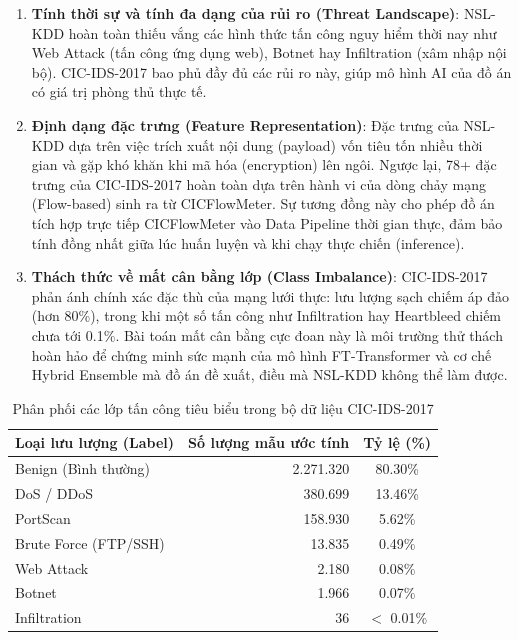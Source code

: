 \documentclass[../DoAn.tex]{subfiles}
\begin{document}
\begin{enumerate}
    \item \textbf{Tính thời sự và tính đa dạng của rủi ro (Threat Landscape)}: NSL-KDD hoàn toàn thiếu vắng các hình thức tấn công nguy hiểm thời nay như Web Attack (tấn công ứng dụng web), Botnet hay Infiltration (xâm nhập nội bộ). CIC-IDS-2017 bao phủ đầy đủ các rủi ro này, giúp mô hình AI của đồ án có giá trị phòng thủ thực tế.
    \item \textbf{Định dạng đặc trưng (Feature Representation)}: Đặc trưng của NSL-KDD dựa trên việc trích xuất nội dung (payload) vốn tiêu tốn nhiều thời gian và gặp khó khăn khi mã hóa (encryption) lên ngôi. Ngược lại, 78+ đặc trưng của CIC-IDS-2017 hoàn toàn dựa trên hành vi của dòng chảy mạng (Flow-based) sinh ra từ CICFlowMeter. Sự tương đồng này cho phép đồ án tích hợp trực tiếp CICFlowMeter vào Data Pipeline thời gian thực, đảm bảo tính đồng nhất giữa lúc huấn luyện và khi chạy thực chiến (inference).
    \item \textbf{Thách thức về mất cân bằng lớp (Class Imbalance)}: CIC-IDS-2017 phản ánh chính xác đặc thù của mạng lưới thực: lưu lượng sạch chiếm áp đảo (hơn 80\%), trong khi một số tấn công như Infiltration hay Heartbleed chiếm chưa tới 0.1\%. Bài toán mất cân bằng cực đoan này là môi trường thử thách hoàn hảo để chứng minh sức mạnh của mô hình FT-Transformer và cơ chế Hybrid Ensemble mà đồ án đề xuất, điều mà NSL-KDD không thể làm được.
\end{enumerate}

\begin{table}[htbp]
\centering
\caption{Phân phối các lớp tấn công tiêu biểu trong bộ dữ liệu CIC-IDS-2017}
\label{tab:cic_distribution}
\begin{tabular}{|l|r|c|}
\hline
\textbf{Loại lưu lượng (Label)} & \textbf{Số lượng mẫu ước tính} & \textbf{Tỷ lệ (\%)} \\
\hline
Benign (Bình thường) & 2.271.320 & 80.30\% \\
\hline
DoS / DDoS & 380.699 & 13.46\% \\
\hline
PortScan & 158.930 & 5.62\% \\
\hline
Brute Force (FTP/SSH) & 13.835 & 0.49\% \\
\hline
Web Attack & 2.180 & 0.08\% \\
\hline
Botnet & 1.966 & 0.07\% \\
\hline
Infiltration & 36 & $<$ 0.01\% \\
\hline
\end{tabular}
\end{table}
\end{document}

